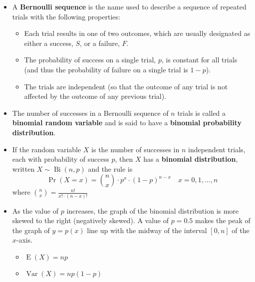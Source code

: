 \documentclass[12pt,a4paper,titlepage]{article}
\DeclareMathOperator{\E}{E}
\DeclareMathOperator{\Var}{Var}
\DeclareMathOperator{\Bi}{Bi}
\begin{document}
            \begin{SummaryBox}[title=Bernoulli sequence]
                \begin{itemize}[leftmargin=*]
                    \item A \textbf{Bernoulli sequence} is the name used to describe a sequence of repeated trials with the following properties:
                    \begin{itemize}[topsep=0pt]
                        \item Each trial results in one of two outcomes, which are usually designated as either a success, $S$, or a failure, $F$.
                        \item The probability of success on a single trial, $p$, is constant for all trials (and thus the probability of failure on a single trial is $1 - p$).
                        \item The trials are independent (so that the outcome of any trial is not affected by the outcome of any previous trial).
                    \end{itemize}
                \end{itemize}
            \end{SummaryBox}
            
            \begin{SummaryBox}[title=Binomial probability distribution]
                \begin{itemize}[leftmargin=*]
                    \item The number of successes in a Bernoulli sequence of $n$ trials is called a \textbf{binomial random variable} and is said to have a \textbf{binomial probability distribution}.
                    \item If the random variable $X$ is the number of successes in $n$ independent trials, each with probability of success $p$, then $X$ has a \textbf{binomial distribution}, written $X \sim \Bi(n,p)$ and the rule is
                    \[
                        \Pr(X=x) = \binom{n}{x} \cdot p^x \cdot (1-p)^{n-x} \quad x=0,1,\dots,n
                    \]
                    where $\binom{n}{x} = \frac{n!}{x! \cdot (n - x)!}$
                    \item As the value of $p$ increases, the graph of the binomial distribution is more skewed to the right (negatively skewed). A value of $p=0.5$ makes the peak of the graph of $y=p(x)$ line up with the midway of the interval $[0,n]$ of the $x$-axis.
                    
                    \begin{SummaryExtensionBox}[title=Population parameters for the binomial distribution]
                        \begin{itemize}[leftmargin=*]
                            \item $\E(X) = np$
                            \item $\Var(X) = np(1-p)$
                        \end{itemize}
                    \end{SummaryExtensionBox}
                \end{itemize}
            \end{SummaryBox}
            
\end{document}

